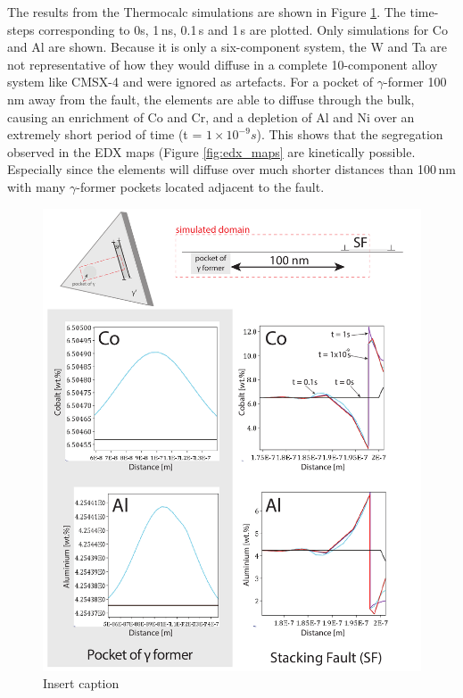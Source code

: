 \documentclass[a4paper,12pt,times,numbered,print,index]{Classes/PhDThesisPSnPDF}
\begin{document}
The results from the Thermocalc simulations are shown in Figure \ref{fig:dictra}. The time-steps corresponding to 0s, 1\,ns, 0.1\,s and 1\,s are plotted. Only simulations for Co and Al are shown. Because it is only a six-component system, the W and Ta are not representative of how they would diffuse in a complete 10-component alloy system like CMSX-4 and were ignored as artefacts. For a pocket of $\gamma$-former 100 nm away from the fault, the elements are able to diffuse through the bulk, causing an enrichment of Co and Cr, and a depletion of Al and Ni over an extremely short period of time (t = $1\times10^{-9} s$). This shows that the segregation observed in the EDX maps (Figure \ref{fig:edx_maps} are kinetically possible. Especially since the elements will diffuse over much shorter distances than 100\,nm with many $\gamma$-former pockets located adjacent to the fault.\\
\begin{figure}
    \centering
    \includegraphics[width=\textwidth,keepaspectratio]{Figures/dictra_simul_1.pdf}
    \caption{Insert caption}
    \label{fig:dictra}
\end{figure}
\end{document}
